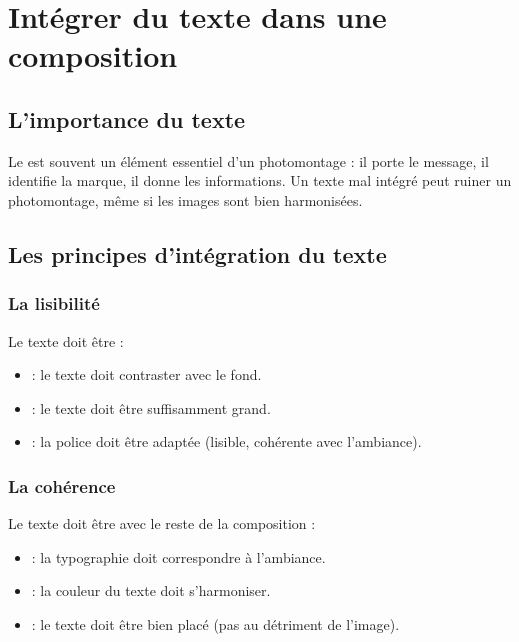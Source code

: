 \section{Intégrer du texte dans une composition}

\subsection{L'importance du texte}

Le  est souvent un élément essentiel d'un photomontage : il porte le message, il identifie la marque, il donne les informations. Un texte mal intégré peut ruiner un photomontage, même si les images sont bien harmonisées.

\subsection{Les principes d'intégration du texte}

\subsubsection{La lisibilité}

Le texte doit être  :

\begin{itemize}
    \item {} : le texte doit contraster avec le fond.
    \item {} : le texte doit être suffisamment grand.
    \item {} : la police doit être adaptée (lisible, cohérente avec l'ambiance).
\end{itemize}

\subsubsection{La cohérence}

Le texte doit être  avec le reste de la composition :

\begin{itemize}
    \item {} : la typographie doit correspondre à l'ambiance.
    \item {} : la couleur du texte doit s'harmoniser.
    \item {} : le texte doit être bien placé (pas au détriment de l'image).
\end{itemize}

